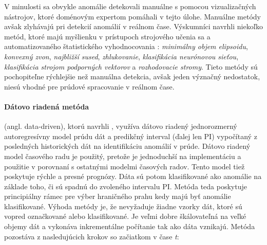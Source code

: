 V minulosti sa obvykle anomálie detekovali manuálne s pomocou vizualizačných nástrojov, ktoré doménovým expertom pomáhali v tejto úlohe. Manuálne metódy avšak zlyhávajú pri detekcií anomálií v reálnom čase. Výskumníci navrhli niekoľko metód, ktoré majú myšlienku v prístupoch strojového učenia sa a automatizovaného štatistického vyhodnocovania \citep{hill2010anomaly}: \textit{minimálny objem elipsoidu}, \textit{konvexný zvon}, \textit{najbližší sused}, \textit{zhlukovanie}, \textit{klasifikácia neurónovou sieťou}, \textit{klasifikácia strojom podporných vektorov} a \textit{rozhodovacie stromy}. Tieto metódy sú pochopiteľne rýchlejšie než manuálna detekcia, avšak jeden význačný nedostatok, niesú vhodné pre prúdové spracovanie v reálnom čase.
\paragraph{Dátovo riadená metóda} (angl. data-driven), ktorú navrhli \citep{hill2010anomaly}, využíva dátovo riadený jednorozmerný autoregresívny model prúdu dát a predikčný interval (ďalej len PI) vypočítaný z posledných historických dát na identifikáciu anomálií v prúde. Dátovo riadený model časového radu je použitý, pretože je jednoduchší na implementáciu a použitie v porovnaní s ostatnými modelmi časových radov. Tento model tiež poskytuje rýchle a presné prognózy. Dáta sú potom klasifikované ako anomálie na základe toho, či sú spadnú do zvoleného intervalu PI. Metóda teda poskytuje principiálny rámec pre výber hraničného prahu kedy majú byť anomálie klasifikované. Výhoda metódy je, že nevyžaduje žiadne vzorky dát, ktoré sú vopred označkované alebo klasifikované. Je veľmi dobre škálovateľná na veľké objemy dát a vykonáva inkrementálne počítanie tak ako dáta vznikajú.
Metóda pozostáva z nasledujúcich krokov so začiatkom v čase \textit{t}:
